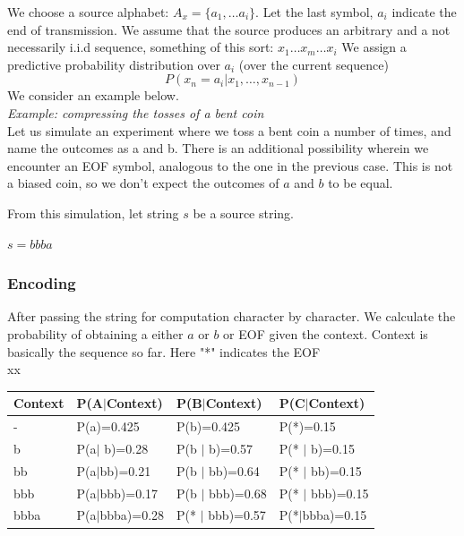 \documentclass[10pt,twocolumn,letterpaper]{article}
\begin{document}
We choose a source alphabet: $A_x = \{a_1, \dots a_i\}$. Let the last symbol, $a_i$ indicate the end of transmission. 
We assume that the source produces an arbitrary and a not necessarily i.i.d sequence, something of this sort: $x_1\dots x_m\dots x_i$
We assign a predictive probability distribution over $a_i$ (over the current sequence) 
\begin{equation}
   P(x_n = a_i \vert x_1,\dots, x_{n-1}) 
\end{equation}
We consider an example below.\\
\emph{Example: compressing the tosses of a bent coin}\\
Let us simulate an experiment where we toss a bent coin a number of times, and name the outcomes as a and b.
There is an additional possibility wherein we encounter an EOF symbol, analogous to the one in the previous case.
This is not a biased coin, so we don't expect the outcomes of $a$ and $b$ to be equal.

From this simulation, let string $s$ be a source string. \\
\begin{center}
    $s = bbba$\\
\end{center}


\subsubsection{Encoding}
After passing the string for computation character by character. We calculate the probability of obtaining a either $a$ or $b$ or EOF given the context.
Context is basically the sequence so far. Here "*" indicates the EOF
\\
xx
\begin{table}[htbp]
    \begin{tabular}{|l|l|l|l| }
    \hline
    Context & P(A$\vert$Context)     & P(B$\vert$Context)    & P(C$\vert$Context)     \\
    \hline
    -       & P(a)=0.425       & P(b)=0.425      & P(*)=0.15        \\
    \hline
    b       & P(a$\vert$ b)=0.28    & P(b $\vert$ b)=0.57   & P(* $\vert$ b)=0.15    \\
    \hline
    bb      & P(a$\vert$bb)=0.21   & P(b $\vert$ bb)=0.64  & P(* $\vert$ bb)=0.15   \\
    \hline
    bbb     & P(a$\vert$bbb)=0.17  & P(b $\vert$ bbb)=0.68 & P(* $\vert$ bbb)=0.15  \\
    \hline
    bbba    & P(a$\vert$bbba)=0.28 & P(* $\vert$ bbb)=0.57 & P(*$\vert$bbba)=0.15 \\
    \hline
    \end{tabular}
    \end{table}
\end{document}
